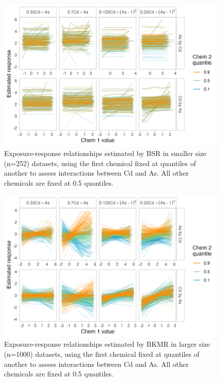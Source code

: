 \documentclass[12pt, twoside]{amherstthesis}
\begin{document}
\begin{figure}

{\centering \includegraphics[width=0.85\linewidth]{figures/ch4_ssm_biv_expresp_2} 

}

\caption{Exposure-response relationships estimated by BSR in smaller size (n=252) datasets, using the first chemical fixed at quantiles of another to assess interactions between Cd and As. All other chemicals are fixed at 0.5 quantiles.}\label{fig:ssmcdas}
\end{figure}
\begin{figure}

{\centering \includegraphics[width=0.85\linewidth]{figures/ch4_klg_biv_expresp_2} 

}

\caption{Exposure-response relationships estimated by BKMR in larger size (n=1000) datasets, using the first chemical fixed at quantiles of another to assess interactions between Cd and As. All other chemicals are fixed at 0.5 quantiles.}\label{fig:klgcdas}
\end{figure}
\end{document}

